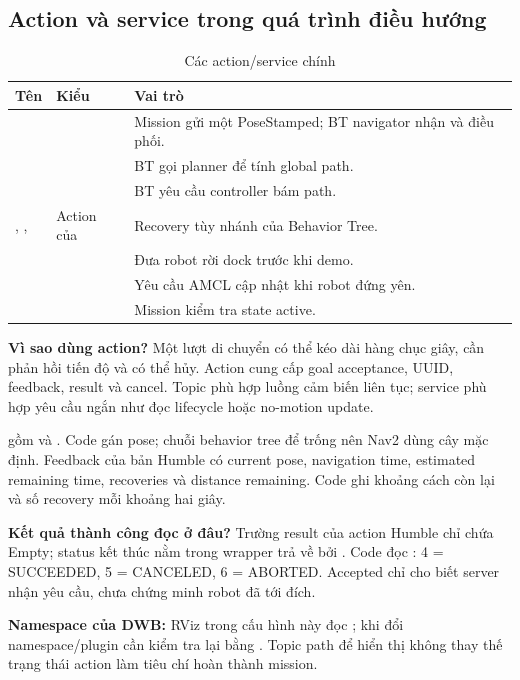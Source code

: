 \subsection{Action và service trong quá trình điều hướng}
\begin{table}[H]\centering\small
\caption{Các action/service chính}
\begin{tabularx}{\linewidth}{@{}P{4cm}P{4.3cm}Y@{}}\toprule
Tên&Kiểu&Vai trò\\\midrule
{}&&Mission gửi một PoseStamped; BT navigator nhận và điều phối.\\
&&BT gọi planner để tính global path.\\
&&BT yêu cầu controller bám path.\\
, , &Action của &Recovery tùy nhánh của Behavior Tree.\\
&&Đưa robot rời dock trước khi demo.\\
&&Yêu cầu AMCL cập nhật khi robot đứng yên.\\
&&Mission kiểm tra state active.\\\bottomrule
\end{tabularx}\end{table}
\textbf{Vì sao dùng action?} Một lượt di chuyển có thể kéo dài hàng chục giây, cần phản hồi tiến độ và có thể hủy. Action cung cấp goal acceptance, UUID, feedback, result và cancel. Topic phù hợp luồng cảm biến liên tục; service phù hợp yêu cầu ngắn như đọc lifecycle hoặc no-motion update.

 gồm  và . Code gán pose; chuỗi behavior tree để trống nên Nav2 dùng cây mặc định. Feedback của bản Humble có current pose, navigation time, estimated remaining time, recoveries và distance remaining. Code ghi khoảng cách còn lại và số recovery mỗi khoảng hai giây.

\textbf{Kết quả thành công đọc ở đâu?} Trường result của action Humble chỉ chứa Empty; status kết thúc nằm trong wrapper trả về bởi . Code đọc : 4 = SUCCEEDED, 5 = CANCELED, 6 = ABORTED. Accepted chỉ cho biết server nhận yêu cầu, chưa chứng minh robot đã tới đích.

\textbf{Namespace của DWB:} RViz trong cấu hình này đọc ; khi đổi namespace/plugin cần kiểm tra lại bằng . Topic path để hiển thị không thay thế trạng thái action làm tiêu chí hoàn thành mission.
